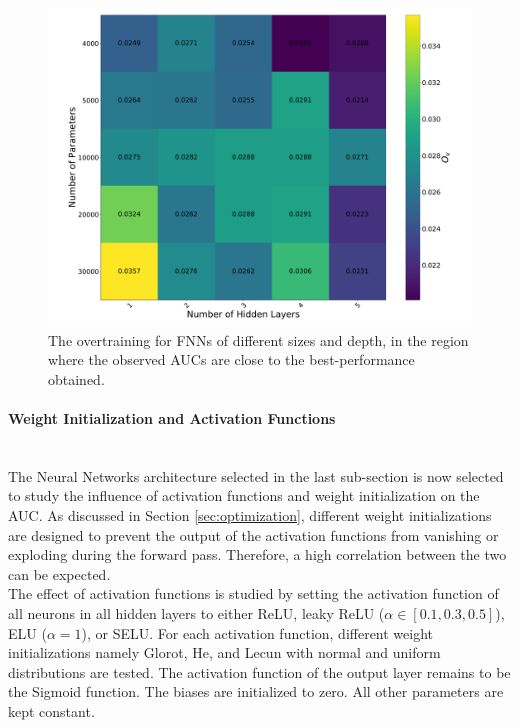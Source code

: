 \begin{figure}[H]
\centering
\includegraphics[width=\linewidth]{figs/FNN/Heat_ParaLayers}
\caption{The overtraining for FNNs of different sizes and depth, in the region where the observed AUCs are close to the best-performance obtained.}
\label{fig:RegionPara}
\end{figure}

\newpage

\paragraph{Weight Initialization and Activation Functions} \mbox{} \\

The Neural Networks architecture selected in the last sub-section is now selected to study the influence of activation functions and weight initialization on the AUC. As discussed in Section \ref{sec:optimization}, different weight initializations are designed to prevent the output of the activation functions from vanishing or exploding during the forward pass. Therefore, a high correlation between the two can be expected. \\
The effect of activation functions is studied by setting the activation function of all neurons in all hidden layers to either ReLU, leaky ReLU ($\alpha \in [0.1,0.3,0.5]$), ELU ($\alpha = 1$), or  SELU. For each activation function, different weight initializations namely Glorot, He, and Lecun with normal and uniform distributions are tested. The activation function of the output layer remains to be the Sigmoid function. The biases are initialized to zero. All other parameters are kept constant. \\

